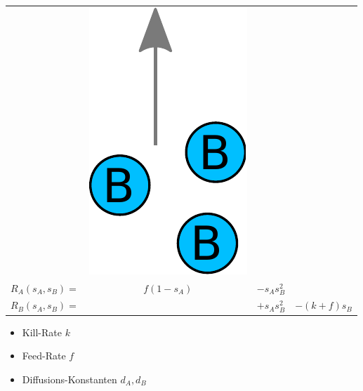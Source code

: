 \documentclass[12pt]{beamer}
\begin{document}
\begin{frame}
\begin{tabular}{ r c c c }
      &
      \includegraphics[scale=0.2]{Bilder/gs_kill.pdf}
	  \\
	  \(
		R_A(s_A,s_B)=
	  \)
	  &
	  \(
		f(1-s_A)
	  \)
	  &
	  \(
		- s_A s_B^2
	  \)
	  &
	  \\
	  \(
		R_B(s_A,s_B)=
	  \)
	  &
	  &
	  \(
		+ s_A s_B^2
	  \)
	  &
	  \(
		- (k + f) s_B
	  \)
	  \\
      \end{tabular}
      \renewcommand{\arraystretch}{1.0}

      \begin{itemize}
	  \item Kill-Rate $k$
	  \item Feed-Rate $f$
	  \item Diffusions-Konstanten $d_A, d_B$
      \end{itemize}
    
      \end{frame}
\end{document}
